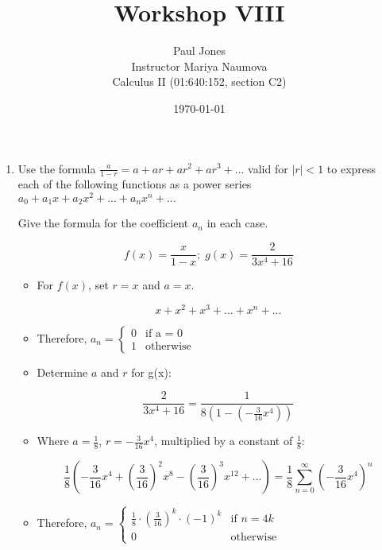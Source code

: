 \documentclass[11pt]{article}
\title{Workshop VIII}
\author{Paul Jones \\
		Instructor Mariya Naumova\\
		Calculus II (01:640:152, section C2)}
\date{\today}
\begin{document}
\maketitle

\pagebreak

\begin{enumerate}

	\item Use the formula $\frac{a}{1-r} = a + ar + ar^2 + ar^3 + ... $ valid for 
	$|r| < 1$ to express each of the following functions as a power series
	$a_0 + a_1 x + a_2 x^2 + ... + a_n x^n + ...$

	Give the formula for the coefficient $a_{n}$ in each case.

	\begin{equation*}
		f(x) = \frac{x}{1 - x}; \; g(x) = \frac{2}{3x^{4} + 16}
	\end{equation*}	

	\begin{itemize}
		\item For $f(x)$, set $r = x$ and $a = x$.

		\begin{equation*}
			x + x^2 + x^3 + ... + x^n + ...
		\end{equation*}
		
		\item Therefore, $a_n = \begin{cases} 0 & \text{if a = 0} \\ 1 &\text{otherwise}\end{cases}$
		
		\item Determine $a$ and $r$ for g(x):
		
		\begin{equation*}
			\frac{2}{3x^4 + 16} = \frac{1}{8(1 - (-\frac{3}{16}x^4))}
		\end{equation*}
		
		\item Where $a = \frac{1}{8}$, $r = -\frac{3}{16}x^4$, 
		multiplied by a constant of $\frac{1}{8}$:
		
		\begin{equation*}
			\frac{1}{8}
			\left(		
			-\frac{3}{16} x^4 + 
			\left( \frac{3}{16}\right)^{2} x^{8} -
			\left( \frac{3}{16}\right)^{3} x^{12}  + ...
			\right)
			= \frac{1}{8}\sum_{n = 0}^{\infty}\left(-\frac{3}{16}x^4 \right)^n
		\end{equation*}
		
		\item Therefore, $a_n = \begin{cases}
		  \frac{1}{8} \cdot (\frac{3}{16})^k \cdot (-1)^k & \text{if $n = 4k$} \\
		  0 & \text{otherwise} 
		\end{cases}$
		

\end{itemize}
\end{enumerate}
\end{document}
